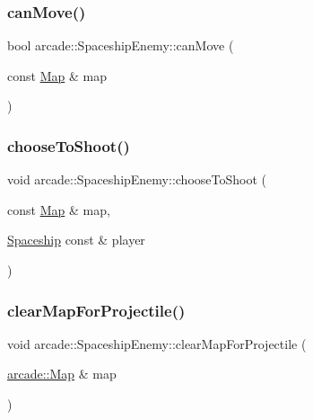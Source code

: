 \subsubsection{\texorpdfstring{can\+Move()}{canMove()}}
{\footnotesize\ttfamily bool arcade\+::\+Spaceship\+Enemy\+::can\+Move (\begin{DoxyParamCaption}\item[{const \hyperlink{classarcade_1_1_map}{Map} \&}]{map }\end{DoxyParamCaption})}

\mbox{\label{classarcade_1_1_spaceship_enemy_a5b01b4ab0dc3602a1a6f2d93aba67cdd}} 
\subsubsection{\texorpdfstring{choose\+To\+Shoot()}{chooseToShoot()}}
{\footnotesize\ttfamily void arcade\+::\+Spaceship\+Enemy\+::choose\+To\+Shoot (\begin{DoxyParamCaption}\item[{const \hyperlink{classarcade_1_1_map}{Map} \&}]{map,  }\item[{\hyperlink{classarcade_1_1_spaceship}{Spaceship} const \&}]{player }\end{DoxyParamCaption})}

\mbox{\label{classarcade_1_1_spaceship_enemy_a76ad6511c8dba9850fb70a1633f8cc87}} 
\subsubsection{\texorpdfstring{clear\+Map\+For\+Projectile()}{clearMapForProjectile()}}
{\footnotesize\ttfamily void arcade\+::\+Spaceship\+Enemy\+::clear\+Map\+For\+Projectile (\begin{DoxyParamCaption}\item[{\hyperlink{classarcade_1_1_map}{arcade\+::\+Map} \&}]{map }\end{DoxyParamCaption})\hspace{0.3cm}{\ttfamily [virtual]}}



